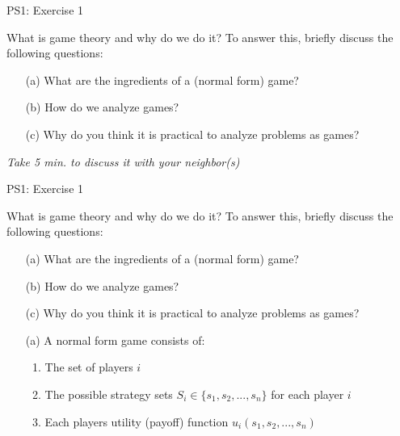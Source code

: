 \begin{frame}{PS1: Exercise 1}
\begin{multicols}{2}
What is game theory and why do we do it? To answer this, briefly discuss the following questions:
\begin{itemize}
  \item[(a)] What are the ingredients of a (normal form) game?
  \item[(b)] How do we analyze games?
  \item[(c)] Why do you think it is practical to analyze problems as games?
\end{itemize}
\vfill\null
\columnbreak
\textit{Take 5 min. to discuss it with your neighbor(s)}
\vfill\null
\end{multicols}
\end{frame}

\begin{frame}{PS1: Exercise 1}
\begin{multicols}{2}
What is game theory and why do we do it? To answer this, briefly discuss the following questions:
\begin{itemize}
  \item[(a)] What are the ingredients of a (normal form) game?
  \item[(b)] How do we analyze games?
  \item[(c)] Why do you think it is practical to analyze problems as games?
\end{itemize}
\vfill\null
\columnbreak
\begin{itemize}
  \item[(a)] A normal form game consists of:
    \begin{enumerate}
      \item The set of players $i$
      \item The possible strategy sets $S_i\in \{s_1,s_2,...,s_n\}$ for each player $i$
      \item Each players utility (payoff) function $u_i(s_1,s_2,...,s_n)$
    \end{enumerate}
\end{itemize}
\vfill\null
\end{multicols}
\end{frame}

